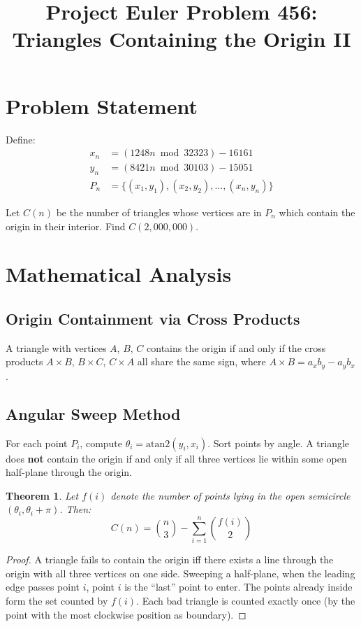 \documentclass[12pt]{article}
\title{Project Euler Problem 456:\\Triangles Containing the Origin II}
\author{}
\date{}
\newtheorem{theorem}{Theorem}
\theoremstyle{definition}
\begin{document}
\maketitle

\section{Problem Statement}
Define:
\begin{align}
x_n &= (1248n \bmod 32323) - 16161 \\
y_n &= (8421n \bmod 30103) - 15051 \\
P_n &= \{(x_1, y_1), (x_2, y_2), \ldots, (x_n, y_n)\}
\end{align}

Let $C(n)$ be the number of triangles whose vertices are in $P_n$ which contain the origin in their interior. Find $C(2{,}000{,}000)$.

\section{Mathematical Analysis}

\subsection{Origin Containment via Cross Products}
A triangle with vertices $A$, $B$, $C$ contains the origin if and only if the cross products $A \times B$, $B \times C$, $C \times A$ all share the same sign, where $A \times B = a_x b_y - a_y b_x$.

\subsection{Angular Sweep Method}
For each point $P_i$, compute $\theta_i = \text{atan2}(y_i, x_i)$. Sort points by angle. A triangle does \textbf{not} contain the origin if and only if all three vertices lie within some open half-plane through the origin.

\begin{theorem}
Let $f(i)$ denote the number of points lying in the open semicircle $(\theta_i, \theta_i + \pi)$. Then:
\[
C(n) = \binom{n}{3} - \sum_{i=1}^{n} \binom{f(i)}{2}
\]
\end{theorem}

\begin{proof}
A triangle fails to contain the origin iff there exists a line through the origin with all three vertices on one side. Sweeping a half-plane, when the leading edge passes point $i$, point $i$ is the ``last'' point to enter. The points already inside form the set counted by $f(i)$. Each bad triangle is counted exactly once (by the point with the most clockwise position as boundary).
\end{proof}
\end{document}
